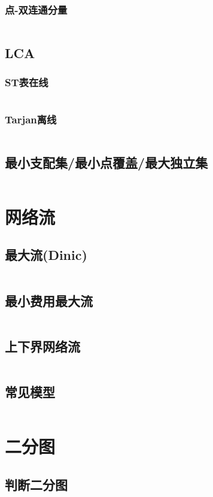 \documentclass[a4paper,9pt]{article}
\begin{document}
\subsubsection{点-双连通分量}
\inputminted[]{c++}{Template/TreeGraph/Tarjan-Vertex-BCC.cpp}
\subsection{LCA}
\subsubsection{ST表在线}
\inputminted[]{c++}{Template/TreeGraph/LCA-ST.cpp}
\subsubsection{Tarjan离线}
\inputminted[]{c++}{Template/TreeGraph/LCA-Tarjan.cpp}
\subsection{最小支配集/最小点覆盖/最大独立集}
\inputminted[]{c++}{Template/TreeGraph/SetPro.cpp}
\section{网络流}
\subsection{最大流(Dinic)}
\inputminted[]{c++}{Template/NetworkFlow/Dinic.cpp}
\subsection{最小费用最大流}
\inputminted[]{c++}{Template/NetworkFlow/mcmf.cpp}
\subsection{上下界网络流}
\inputminted[]{c++}{Template/NetworkFlow/UpDownFlow.cpp}
\subsection{常见模型}
\inputminted[]{c++}{Template/NetworkFlow/FlowModel.cpp}
\section{二分图}
\subsection{判断二分图}
\inputminted[]{c++}{Template/NetworkFlow/BinaryJudge.cpp}
\end{document}
